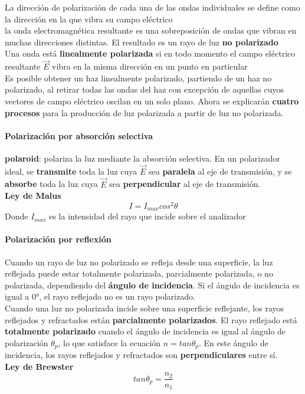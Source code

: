 \documentclass[10pt]{article}
\begin{document}
La dirección de polarización de cada una de las ondas individuales se define como la dirección en la que vibra su campo eléctrico\\
la onda electromagnética resultante es una sobreposición de ondas que vibran en muchas direcciones distintas. El resultado es un rayo de luz \textbf{no polarizado}\\
\linebreak
Una onda está \textbf{linealmente polarizada} si en todo momento el campo eléctrico resultante $\overrightarrow{E}$ vibra en la misma dirección en un punto en particular\\
\linebreak
Es posible obtener un haz linealmente polarizado, partiendo de un haz no polarizado,
al retirar todas las ondas del haz con excepción de aquellas cuyos vectores de campo eléctrico oscilan en un solo plano. Ahora se explicarán \textbf{cuatro procesos} para la producción de luz polarizada a partir de luz no polarizada.
\paragraph{Polarización por absorción selectiva}

\textbf{polaroid}: polariza la luz mediante la absorción selectiva. En un polarizador ideal, se \textbf{transmite} toda la luz cuya $\overrightarrow{E}$  sea \textbf{paralela} al eje de transmisión, y se \textbf{absorbe} toda la luz cuya $\overrightarrow{E}$ sea \textbf{perpendicular} al eje de transmisión.\\
\textbf{Ley de Malus}
\begin{equation*}
	I = I_{max} cos^2 \theta
\end{equation*}
Donde $I_{max}$ es la intensidad del rayo que incide sobre el analizador
\paragraph{Polarización por reflexión}
Cuando un rayo de luz no polarizado se refleja desde una superficie, la luz reflejada puede estar totalmente polarizada, parcialmente polarizada, o no polarizada, dependiendo del \textbf{ángulo de incidencia}. Si el ángulo de incidencia es igual a 0°, el rayo reflejado no es un rayo polarizado.\\
\linebreak
Cuando una luz no polarizada incide sobre una superficie reflejante, los rayos reflejados y refractados están \textbf{parcialmente polarizados}. El rayo reflejado está \textbf{totalmente polarizado} cuando el ángulo de incidencia es igual al ángulo de polarización $\theta_p$, lo que satisface la ecuación $n = tan \theta_p$. En este ángulo de incidencia, los rayos reflejados y refractados son \textbf{perpendiculares} entre sí.\\
\textbf{Ley de Brewster}
\begin{equation*}
	tan \theta_p = \dfrac{n_2}{n_1}
\end{equation*}
\end{document}
